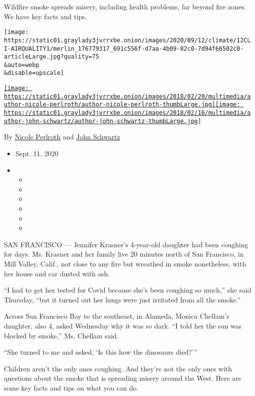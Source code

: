 Wildfire smoke spreads misery, including health problems, far beyond
fire zones. We have key facts and tips.

\texttt{[image: https://static01.graylady3jvrrxbe.onion/images/2020/09/12/climate/12CLI-AIRQUALITY1/merlin\_176779317\_691c556f-d7aa-4b09-82c0-7d94f66502c0-articleLarge.jpg?quality=75\\\&auto=webp\\\&disable=upscale]}

\href{https://www.nytimes3xbfgragh.onion/by/nicole-perlroth}{\texttt{[image: https://static01.graylady3jvrrxbe.onion/images/2018/02/20/multimedia/author-nicole-perlroth/author-nicole-perlroth-thumbLarge.jpg]}}\href{https://www.nytimes3xbfgragh.onion/by/john-schwartz}{\texttt{[image: https://static01.graylady3jvrrxbe.onion/images/2018/02/16/multimedia/author-john-schwartz/author-john-schwartz-thumbLarge.jpg]}}

By \href{https://www.nytimes3xbfgragh.onion/by/nicole-perlroth}{Nicole
Perlroth} and
\href{https://www.nytimes3xbfgragh.onion/by/john-schwartz}{John
Schwartz}

\begin{itemize}
\item
  Sept. 11, 2020
\item
  \begin{itemize}
  \item
  \item
  \item
  \item
  \item
  \item
  \end{itemize}
\end{itemize}

SAN FRANCISCO --- Jennifer Krasner's 4-year-old daughter had been
coughing for days. Ms. Krasner and her family live 20 minutes north of
San Francisco, in Mill Valley, Calif., not close to any fire but
wreathed in smoke nonetheless, with her house and car dusted with ash.

``I had to get her tested for Covid because she's been coughing so
much,'' she said Thursday, ``but it turned out her lungs were just
irritated from all the smoke.''

Across San Francisco Bay to the southeast, in Alameda, Monica Chellam's
daughter, also 4, asked Wednesday why it was so dark. ``I told her the
sun was blocked by smoke,'' Ms. Chellam said.

``She turned to me and asked, `Is this how the dinosaurs died?'''

Children aren't the only ones coughing. And they're not the only ones
with questions about the smoke that is spreading misery around the West.
Here are some key facts and tips on what you can do.

